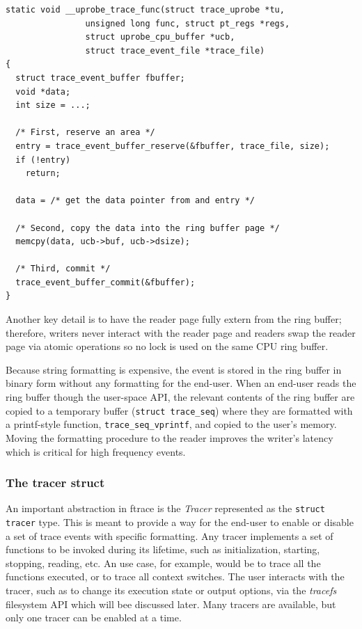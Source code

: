 \begin{verbatim}
static void __uprobe_trace_func(struct trace_uprobe *tu,
				unsigned long func, struct pt_regs *regs,
				struct uprobe_cpu_buffer *ucb,
				struct trace_event_file *trace_file)
{
  struct trace_event_buffer fbuffer;
  void *data;
  int size = ...;

  /* First, reserve an area */
  entry = trace_event_buffer_reserve(&fbuffer, trace_file, size);
  if (!entry)
    return;

  data = /* get the data pointer from and entry */

  /* Second, copy the data into the ring buffer page */
  memcpy(data, ucb->buf, ucb->dsize);

  /* Third, commit */
  trace_event_buffer_commit(&fbuffer);
}
\end{verbatim}

Another key detail is to have the reader page fully extern from the ring buffer;
therefore, writers never interact with the reader page and readers swap the
reader page via atomic operations so no lock is used on the same CPU ring
buffer.

Because string formatting is expensive, the event is stored in the ring buffer
in binary form without any formatting for the end-user. When an end-user reads
the ring buffer though the user-space API, the relevant contents of the ring
buffer are copied to a temporary buffer (\verb|struct trace_seq|) where they are
formatted with a printf-style function, \verb|trace_seq_vprintf|, and copied to
the user's memory. Moving the formatting procedure to the reader improves the
writer's latency which is critical for high frequency events.

\subsubsection*{The tracer struct}

An important abstraction in ftrace is the \textit{Tracer} represented as the
\verb|struct tracer| type. This is meant to provide a way for the end-user to
enable or disable a set of trace events with specific formatting. Any tracer
implements a set of functions to be invoked during its lifetime, such as
initialization, starting, stopping, reading, etc. An use case, for example,
would be to trace all the functions executed, or to trace all context switches.
The user interacts with the tracer, such as to change its execution state or
output options, via the \textit{tracefs} filesystem API which will bee discussed
later. Many tracers are available, but only one tracer can be enabled at a time.

